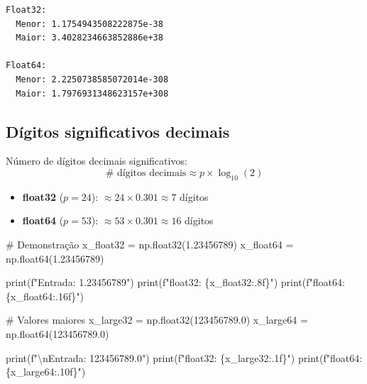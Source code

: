 \documentclass[
  11pt,
  letterpaper,
  DIV=11,
  numbers=noendperiod]{scrartcl}
\newenvironment{Shaded}{\begin{snugshade}}{\end{snugshade}}
\newcommand{\BuiltInTok}[1]{\textcolor[rgb]{0.00,0.23,0.31}{#1}}
\newcommand{\CharTok}[1]{\textcolor[rgb]{0.13,0.47,0.30}{#1}}
\newcommand{\CommentTok}[1]{\textcolor[rgb]{0.37,0.37,0.37}{#1}}
\newcommand{\FloatTok}[1]{\textcolor[rgb]{0.68,0.00,0.00}{#1}}
\newcommand{\NormalTok}[1]{\textcolor[rgb]{0.00,0.23,0.31}{#1}}
\newcommand{\OperatorTok}[1]{\textcolor[rgb]{0.37,0.37,0.37}{#1}}
\newcommand{\SpecialCharTok}[1]{\textcolor[rgb]{0.37,0.37,0.37}{#1}}
\newcommand{\SpecialStringTok}[1]{\textcolor[rgb]{0.13,0.47,0.30}{#1}}
\providecommand{\tightlist}{%
  \setlength{\itemsep}{0pt}\setlength{\parskip}{0pt}}
\begin{document}
\begin{verbatim}
Float32:
  Menor: 1.1754943508222875e-38
  Maior: 3.4028234663852886e+38

Float64:
  Menor: 2.2250738585072014e-308
  Maior: 1.7976931348623157e+308
\end{verbatim}

\subsection{Dígitos significativos
decimais}\label{duxedgitos-significativos-decimais}

Número de dígitos decimais significativos:
\[\text{# dígitos decimais} \approx p \times \log_{10}(2)\]

\begin{itemize}
\tightlist
\item
  \textbf{float32} (\(p = 24\)): \(\approx 24 \times 0.301 \approx 7\)
  dígitos
\item
  \textbf{float64} (\(p = 53\)): \(\approx 53 \times 0.301 \approx 16\)
  dígitos
\end{itemize}

\begin{Shaded}
\begin{Highlighting}[]
\CommentTok{\# Demonstração}
\NormalTok{x\_float32 }\OperatorTok{=}\NormalTok{ np.float32(}\FloatTok{1.23456789}\NormalTok{)}
\NormalTok{x\_float64 }\OperatorTok{=}\NormalTok{ np.float64(}\FloatTok{1.23456789}\NormalTok{)}

\BuiltInTok{print}\NormalTok{(}\SpecialStringTok{f"Entrada:  1.23456789"}\NormalTok{)}
\BuiltInTok{print}\NormalTok{(}\SpecialStringTok{f"float32: }\SpecialCharTok{\{}\NormalTok{x\_float32}\SpecialCharTok{:.8f\}}\SpecialStringTok{"}\NormalTok{)}
\BuiltInTok{print}\NormalTok{(}\SpecialStringTok{f"float64: }\SpecialCharTok{\{}\NormalTok{x\_float64}\SpecialCharTok{:.16f\}}\SpecialStringTok{"}\NormalTok{)}

\CommentTok{\# Valores maiores}
\NormalTok{x\_large32 }\OperatorTok{=}\NormalTok{ np.float32(}\FloatTok{123456789.0}\NormalTok{)}
\NormalTok{x\_large64 }\OperatorTok{=}\NormalTok{ np.float64(}\FloatTok{123456789.0}\NormalTok{)}

\BuiltInTok{print}\NormalTok{(}\SpecialStringTok{f"}\CharTok{\textbackslash{}n}\SpecialStringTok{Entrada:  123456789.0"}\NormalTok{)}
\BuiltInTok{print}\NormalTok{(}\SpecialStringTok{f"float32: }\SpecialCharTok{\{}\NormalTok{x\_large32}\SpecialCharTok{:.1f\}}\SpecialStringTok{"}\NormalTok{)}
\BuiltInTok{print}\NormalTok{(}\SpecialStringTok{f"float64: }\SpecialCharTok{\{}\NormalTok{x\_large64}\SpecialCharTok{:.10f\}}\SpecialStringTok{"}\NormalTok{)}
\end{Highlighting}
\end{Shaded}
\end{document}
